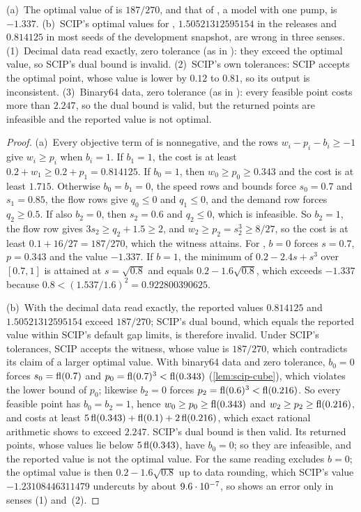 \begin{proposition}\label{prop:scip-reproducers}
\textup{(a)}~The optimal value of  is $187/270$, and that of , a model with one pump, is $-1.337$.
\textup{(b)}~SCIP's optimal values for , $1.50521312595154$ in the releases and $0.814125$ in most seeds of the development snapshot, are wrong in three senses.
(1)~Decimal data read exactly, zero tolerance (as in ): they exceed the optimal value, so SCIP's dual bound is invalid.
(2)~SCIP's own tolerances: SCIP accepts the optimal point, whose value is lower by $0.12$ to $0.81$, so its output is inconsistent.
(3)~Binary64 data, zero tolerance (as in ): every feasible point costs more than $2.247$, so the dual bound is valid, but the returned points are infeasible and the reported value is not optimal.
\end{proposition}

\begin{proof}
(a)~Every objective term of  is nonnegative, and the rows $w_i-p_i-b_i\ge-1$ give $w_i\ge p_i$ when $b_i=1$.
If $b_1=1$, the cost is at least $0.2+w_1\ge0.2+p_1=0.814125$.
If $b_0=1$, then $w_0\ge p_0\ge0.343$ and the cost is at least $1.715$.
Otherwise $b_0=b_1=0$, the speed rows and bounds force $s_0=0.7$ and $s_1=0.85$, the flow rows give $q_0\le0$ and $q_1\le0$, and the demand row forces $q_2\ge0.5$.
If also $b_2=0$, then $s_2=0.6$ and $q_2\le0$, which is infeasible.
So $b_2=1$, the flow row gives $3s_2\ge q_2+1.5\ge2$, and $w_2\ge p_2=s_2^3\ge8/27$, so the cost is at least $0.1+16/27=187/270$, which the witness attains.
For , $b=0$ forces $s=0.7$, $p=0.343$ and the value $-1.337$.
If $b=1$, the minimum of $0.2-2.4s+s^3$ over $[0.7,1]$ is attained at $s=\sqrt{0.8}$ and equals $0.2-1.6\sqrt{0.8}$, which exceeds $-1.337$ because $0.8<(1.537/1.6)^2=0.922800390625$.

(b)~With the decimal data read exactly, the reported values $0.814125$ and $1.50521312595154$ exceed $187/270$; SCIP's dual bound, which equals the reported value within SCIP's default gap limits, is therefore invalid.
Under SCIP's tolerances, SCIP accepts the witness, whose value is $187/270$, which contradicts its claim of a larger optimal value.
With binary64 data and zero tolerance, $b_0=0$ forces $s_0=\operatorname{fl}(0.7)$ and $p_0=\operatorname{fl}(0.7)^3<\operatorname{fl}(0.343)$ (\cref{lem:scip-cube}), which violates the lower bound of $p_0$; likewise $b_2=0$ forces $p_2=\operatorname{fl}(0.6)^3<\operatorname{fl}(0.216)$.
So every feasible point has $b_0=b_2=1$, hence $w_0\ge p_0\ge\operatorname{fl}(0.343)$ and $w_2\ge p_2\ge\operatorname{fl}(0.216)$, and costs at least $5\operatorname{fl}(0.343)+\operatorname{fl}(0.1)+2\operatorname{fl}(0.216)$, which exact rational arithmetic shows to exceed $2.247$.
SCIP's dual bound is then valid.
Its returned points, whose values lie below $5\operatorname{fl}(0.343)$, have $b_0=0$; so they are infeasible, and the reported value is not the optimal value.
For  the same reading excludes $b=0$; the optimal value is then $0.2-1.6\sqrt{0.8}$ up to data rounding, which SCIP's value $-1.23108446311479$ undercuts by about $9.6\cdot 10^{-7}$, so  shows an error only in senses (1) and~(2).
\end{proof}

